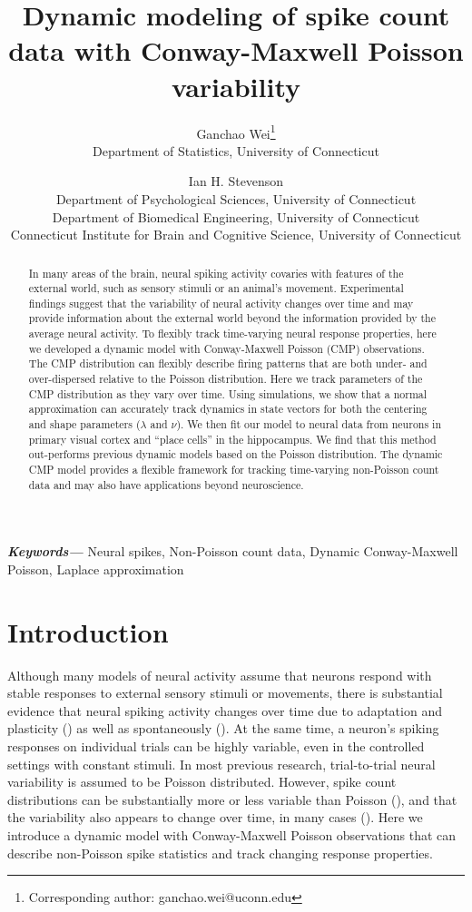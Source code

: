 \documentclass[]{article}
\title{Dynamic modeling of spike count data with Conway-Maxwell Poisson variability}
\author{Ganchao Wei\footnote{Corresponding author: ganchao.wei@uconn.edu}\\ \small Department of Statistics, University of Connecticut
	\and 
	Ian H. Stevenson\\ \small Department of Psychological Sciences, University of Connecticut\\ \small Department of Biomedical Engineering, University of Connecticut\\ \small Connecticut Institute for Brain and Cognitive Science, University of Connecticut }
\date{}
\providecommand{\keywords}[1]
{
	\small	
	\textbf{\textit{Keywords---}} #1
}
\begin{document}
	\maketitle
	
	\begin{abstract}
		In many areas of the brain, neural spiking activity covaries with features of the external world, such as sensory stimuli or an animal’s movement. Experimental findings suggest that the variability of neural activity changes over time and may provide information about the external world beyond the information provided by the average neural activity. To flexibly track time-varying neural response properties, here we developed a dynamic model with Conway-Maxwell Poisson (CMP) observations. The CMP distribution can flexibly describe firing patterns that are both under- and over-dispersed relative to the Poisson distribution. Here we track parameters of the CMP distribution as they vary over time. Using simulations, we show that a normal approximation can accurately track dynamics in state vectors for both the centering and shape parameters ($\lambda$ and $\nu$). We then fit our model to neural data from neurons in primary visual cortex and “place cells” in the hippocampus. We find that this method out-performs previous dynamic models based on the Poisson distribution. The dynamic CMP model provides a flexible framework for tracking time-varying non-Poisson count data and may also have applications beyond neuroscience.
	\end{abstract}
	
	
	\keywords{Neural spikes, Non-Poisson count data, Dynamic Conway-Maxwell Poisson, Laplace approximation}
	
	\section{Introduction}
	Although many models of neural activity assume that neurons respond with stable responses to external sensory stimuli or movements, there is substantial evidence that neural spiking activity changes over time due to adaptation and plasticity (\cite{Brown2001,Lesica2007}) as well as spontaneously (\cite{Rokni2007,Tomko1974}). At the same time, a neuron’s spiking responses on individual trials can be highly variable, even in the controlled settings with constant stimuli. In most previous research, trial-to-trial neural variability is assumed to be Poisson distributed. However, spike count distributions can be substantially more or less variable than Poisson (\cite{Maimon2009,Amarasingham2006,DeWeese2003,Kara2000}), and that the variability also appears to change over time, in many cases (\cite{Churchland2010,Churchland2011}). Here we introduce a dynamic model with Conway-Maxwell Poisson observations that can describe non-Poisson spike statistics and track changing response properties.
	
\end{document}
